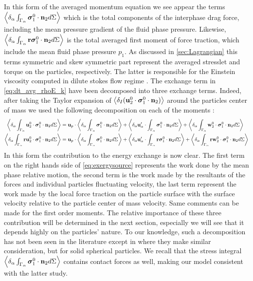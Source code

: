 In this form of the averaged momentum equation we see appear the terms $\left<\delta_\alpha \int_{\Gamma_\alpha} \bm{\sigma}_1^0 \cdot \textbf{n}_2 d\Sigma\right>$ which is the total components of the interphase drag force, including the mean pressure gradient of the fluid phase pressure. 
Likewise, $\left<\delta_\alpha \int_{\Gamma_\alpha} \textbf{r}\bm{\sigma}_1^0 \cdot \textbf{n}_2 d\Sigma\right>$ is the total averaged first moment of force traction, which include the mean fluid phase pressure $p_1$. 
As discussed in \ref{sec:Lagrangian} this terms symmetric and skew symmetric part represent the averaged stresslet and torque on the particles, respectively.  
The latter is responsible for the Einstein viscosity computed in dilute stokes flow regime \citep{guazzelli2011}. 
The exchange term in \ref{eq:dt_avg_rhoE_k} have been decomposed into three exchange terms.
Indeed, after taking the Taylor expansion of $\left<\delta_I (\textbf{u}^0_2 \cdot \bm{\sigma}_1^0 \cdot \textbf{n}_2)\right>$ around the particles center of mass we used the following decomposition on each of the moments :
\begin{align}
    \label{eq:exergysource}
    \left<\delta_\alpha  \int_{\Gamma_\alpha} \textbf{u}^0_2 \cdot \bm{\sigma}_1^0 \cdot \textbf{n}_2 d\Sigma\right>
    &= 
    \textbf{u}_p \cdot \left<\delta_\alpha \int_{\Gamma_\alpha} {\bm{\sigma}_1^0 \cdot \textbf{n}_2} d\Sigma\right>
    + \left<\delta_\alpha  \textbf{u}_\alpha' \cdot \int_{\Gamma_\alpha}   \bm{\sigma}_1^0 \cdot \textbf{n}_2 d\Sigma\right>
    + \left<\delta_\alpha  \int_{\Gamma_\alpha} \textbf{w}_2^0 \cdot \bm{\sigma}_1^0 \cdot \textbf{n}_2 d\Sigma\right>\\
    \left<\delta_\alpha  \int_{\Gamma_\alpha} \textbf{r}\textbf{u}^0_2 \cdot \bm{\sigma}_1^0 \cdot \textbf{n}_2 d\Sigma\right>
   &= 
    \textbf{u}_p \cdot \left<\delta_\alpha \int_{\Gamma_\alpha} {\bm{\sigma}_1^0 \cdot \textbf{n}_2} d\Sigma\right>
    + \left<\delta_\alpha  \textbf{u}_\alpha' \cdot \int_{\Gamma_\alpha} \textbf{r}  \bm{\sigma}_1^0 \cdot \textbf{n}_2 d\Sigma\right>
    + \left<\delta_\alpha  \int_{\Gamma_\alpha} \textbf{r}\textbf{w}_2^0 \cdot \bm{\sigma}_1^0 \cdot \textbf{n}_2 d\Sigma\right>
\end{align}
In this form the contribution to the energy exchange is now clear. 
The first term on the right hands side of \ref{eq:exergysource} represents the work done by the mean phase relative motion, the second term is the work made by the resultants of the forces and individual particles fluctuating velocity, the last term represent the work made by the local force traction on the particle surface with the surface velocity relative to the particle center of mass velocity.
Same comments can be made for the first order moments. 
The relative importance of these three contribution will be determined in the next section, especially we will see that  it depends highly on the particles' nature. 
To our knowledge, such a decomposition has not been seen in the literature except in \citep[Chapter 2]{scorsim2021particle} where they make similar consideration, but for solid spherical particles.
We recall that the stress integral $\left<\delta_\alpha \int_{\Gamma_\alpha} \bm{\sigma}_1^0 \cdot \textbf{n}_2 d\Sigma\right>$ contains contact forces as well, making our model consistent with the latter study. 


